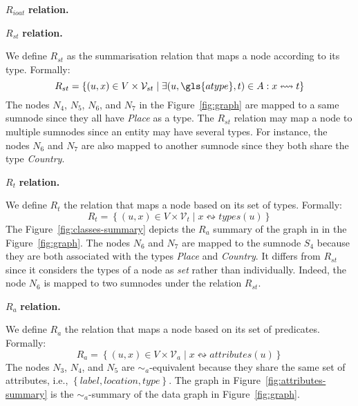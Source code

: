 \begin{labeling}{$R_{ioat}$ \textbf{relation.}}
\item[$R_{st}$ \textbf{relation.}]

We define $R_{st}$ as the summarisation relation that maps a node according to its type. Formally:
$$
R_{st} = \left\lbrace (u, x) \in V \times \mathcal{V}_{st} \mid \exists (u,\gls{atype},t) \in A : x \leftrightsquigarrow t \right\rbrace
$$
The nodes $N_4$, $N_5$, $N_6$, and $N_7$ in the Figure~\ref{fig:graph} are mapped to a same sumnode since they all have \emph{Place} as a type. The $R_{st}$ relation may map a node to multiple sumnodes since an entity may have several types. For instance, the nodes $N_6$ and $N_7$ are also mapped to another sumnode since they both share the type \emph{Country}.

\item[$R_t$ \textbf{relation.}]

We define $R_t$ the relation that maps a node based on its set of types. Formally:
$$
R_t = \left\lbrace (u, x) \in V \times \mathcal{V}_t \mid x \leftrightsquigarrow types(u) \right\rbrace
$$
The Figure~\ref{fig:classes-summary} depicts the $R_a$ summary of the graph in in the Figure~\ref{fig:graph}. The nodes $N_6$ and $N_7$ are mapped to the sumnode $S_4$ because they are both associated with the types \emph{Place} and \emph{Country}. It differs from $R_{st}$ since it considers the types of a node as \emph{set} rather than individually. Indeed, the node $N_6$ is mapped to two sumnodes under the relation $R_{st}$.

\item[$R_a$ \textbf{relation.}]

We define $R_a$ the relation that maps a node based on its set of predicates. Formally:
$$
R_a = \left\lbrace (u, x) \in V \times \mathcal{V}_a \mid x \leftrightsquigarrow attributes(u) \right\rbrace
$$
The nodes $N_3$, $N_4$, and $N_5$ are $\sim_a$-equivalent because they share the same set of attributes, i.e., $\left\lbrace label, location, type \right\rbrace$. The graph in Figure~\ref{fig:attributes-summary} is the $\sim_a$-summary of the data graph in Figure~\ref{fig:graph}.


\end{labeling}
